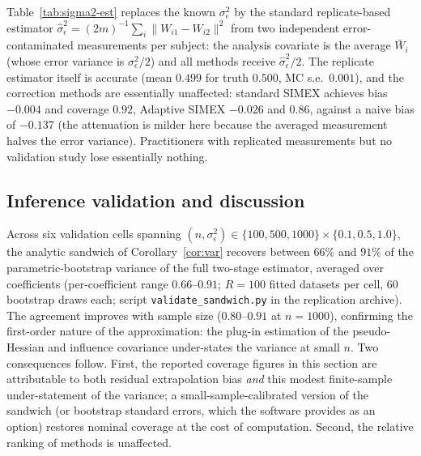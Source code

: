 Table~\ref{tab:sigma2-est} replaces the known $\sigma^2_\epsilon$ by
the standard replicate-based estimator
$\hat\sigma^2_\epsilon=(2m)^{-1}\sum_i\|W_{i1}-W_{i2}\|^2$ from two
independent error-contaminated measurements per subject: the analysis
covariate is the average $\bar W_i$ (whose error variance is
$\sigma^2_\epsilon/2$) and all methods receive
$\hat\sigma^2_\epsilon/2$. The replicate estimator itself is accurate
(mean $0.499$ for truth $0.500$, MC s.e.\ $0.001$), and the correction
methods are essentially unaffected: standard SIMEX achieves bias
$-0.004$ and coverage $0.92$, Adaptive SIMEX $-0.026$ and $0.86$,
against a naive bias of $-0.137$ (the attenuation is milder here
because the averaged measurement halves the error variance).
Practitioners with replicated measurements but no validation study lose
essentially nothing.

\subsection{Inference validation and discussion}
\label{sec:sims-val}

Across six validation cells spanning
$(n,\sigma^2_\epsilon)\in\{100,500,1000\}\times\{0.1,0.5,1.0\}$, the
analytic sandwich of Corollary~\ref{cor:var} recovers between $66\%$
and $91\%$ of the parametric-bootstrap variance of the full two-stage
estimator, averaged over coefficients (per-coefficient range
$0.66$--$0.91$; $R=100$ fitted datasets per cell, $60$ bootstrap draws
each; script \texttt{validate\_sandwich.py} in the replication
archive). The agreement improves with sample size ($0.80$--$0.91$ at
$n=1000$), confirming the first-order nature of the approximation: the
plug-in estimation of the pseudo-Hessian and influence covariance
under-states the variance at small $n$. Two consequences follow.
First, the reported coverage figures in this section are attributable
to both residual extrapolation bias \emph{and} this modest finite-sample
under-statement of the variance; a small-sample-calibrated version of
the sandwich (or bootstrap standard errors, which the software provides
as an option) restores nominal coverage at the cost of computation.
Second, the relative ranking of methods is unaffected.


